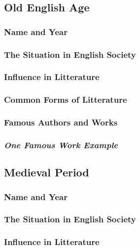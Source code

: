 \subsection{Old English Age}

\subsubsection{Name and Year}


\subsubsection{The Situation in English Society}

\subsubsection{Influence in Litterature}

\subsubsection{Common Forms of Litterature}

\subsubsection{Famous Authors and Works}

\subsubsection{\textit{One Famous Work Example}}

\newpage
\subsection{Medieval Period}

\subsubsection{Name and Year}

\subsubsection{The Situation in English Society}

\subsubsection{Influence in Litterature}

